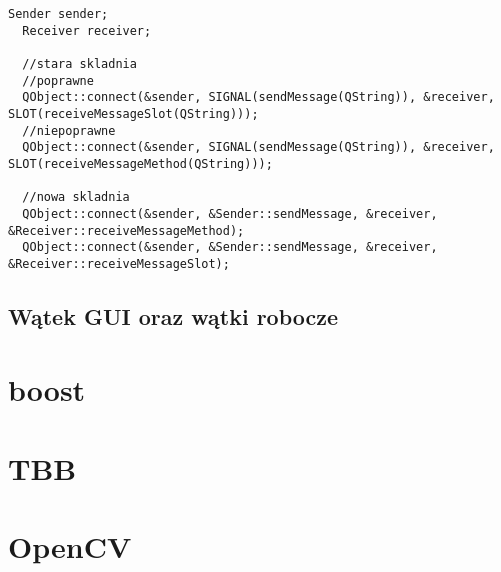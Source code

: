 
	\begin{lstlisting}[label=connectionsyntax, caption={Składnia tworzenia połączeń między obiektami},alsoletter={()[].=}]
  Sender sender;
  Receiver receiver;
  
  //stara skladnia
  //poprawne
  QObject::connect(&sender, SIGNAL(sendMessage(QString)), &receiver, SLOT(receiveMessageSlot(QString)));
  //niepoprawne
  QObject::connect(&sender, SIGNAL(sendMessage(QString)), &receiver, SLOT(receiveMessageMethod(QString)));
  
  //nowa skladnia
  QObject::connect(&sender, &Sender::sendMessage, &receiver, &Receiver::receiveMessageMethod);
  QObject::connect(&sender, &Sender::sendMessage, &receiver, &Receiver::receiveMessageSlot);
	\end{lstlisting}


\subsection{Wątek GUI oraz wątki robocze}

 \section{boost}

 \section{TBB}

 \section{OpenCV}

